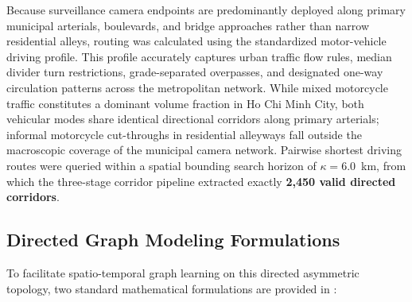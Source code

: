 \documentclass[preprint,12pt]{elsarticle}
\begin{document}
Because surveillance camera endpoints are predominantly deployed along primary municipal arterials, boulevards, and bridge approaches rather than narrow residential alleys, routing was calculated using the standardized motor-vehicle driving profile. This profile accurately captures urban traffic flow rules, median divider turn restrictions, grade-separated overpasses, and designated one-way circulation patterns across the metropolitan network. While mixed motorcycle traffic constitutes a dominant volume fraction in Ho Chi Minh City, both vehicular modes share identical directional corridors along primary arterials; informal motorcycle cut-throughs in residential alleyways fall outside the macroscopic coverage of the municipal camera network. Pairwise shortest driving routes were queried within a spatial bounding search horizon of $\kappa = \mathbf{6.0}$~km, from which the three-stage corridor pipeline extracted exactly \textbf{2,450 valid directed corridors}.

\subsection{Directed Graph Modeling Formulations}
To facilitate spatio-temporal graph learning on this directed asymmetric topology, two standard mathematical formulations are provided in :
\end{document}
